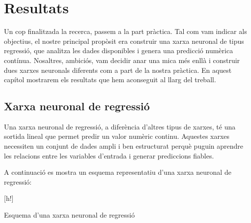 \chapter{Resultats}
\label{c:Resultats}

Un cop finalitzada la recerca, passem a la part pràctica. Tal com vam indicar als objectius, el nostre principal propòsit era construir una xarxa neuronal de tipus regressió, que analitza les dades disponibles i genera una predicció numèrica contínua. Nosaltres, ambiciós, vam decidir anar una mica més enllà i construir dues xarxes neuronals diferents com a part de la nostra pràctica. En aquest capítol mostrarem els resultats que hem aconseguit al llarg del treball.

\section{Xarxa neuronal de regressió}\label{sec:op}

Una xarxa neuronal de regressió, a diferència d’altres tipus de xarxes, té una sortida lineal que permet predir un valor numèric continu. Aquestes xarxes necessiten un conjunt de dades ampli i ben estructurat perquè puguin aprendre les relacions entre les variables d’entrada i generar prediccions fiables.

A continuació es mostra un esquema representatiu d’una xarxa neuronal de regressió:

\begin{center}[h!]
\centering
{}
\small{Esquema d’una xarxa neuronal de regressió}
\end{center}

